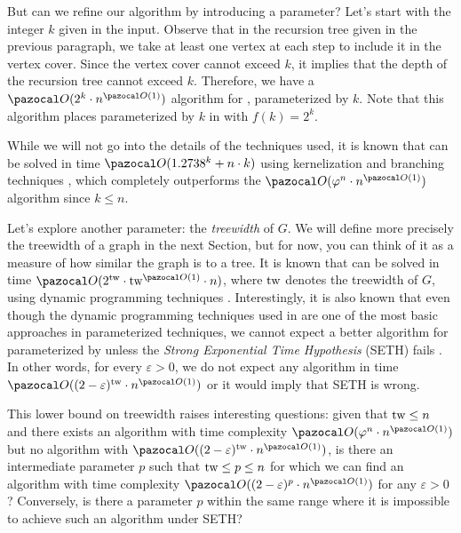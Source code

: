 \medskip

But can we refine our algorithm by introducing a parameter? Let's start with the integer $k$ given in the input. Observe that in the recursion tree given in the previous paragraph, we take at least one vertex at each step to include it in the vertex cover. Since the vertex cover cannot exceed $k$, it implies that the depth of the recursion tree cannot exceed $k$. Therefore, we have a $\O(2^k \cdot n^{\O(1)})$ algorithm for , parameterized by $k$. Note that this algorithm places  parameterized by $k$ in  with $f(k) = 2^k$.

While we will not go into the details of the techniques used, it is known that  can be solved in time $\O(1.2738^k + n\cdot k)$ using kernelization and branching techniques \cite{chen2006improved}, which completely outperforms the $\O(\varphi^n \cdot n^{\O(1)})$ algorithm since $k \leq n$.

\medskip

Let's explore another parameter: the \textit{treewidth} of $G$. We will define more precisely the treewidth of a graph in the next Section, but for now, you can think of it as a measure of how similar the graph is to a tree. It is known that  can be solved in time $\O(2^{\tw}\cdot\tw^{\O(1)}\cdot n)$, where $\text{tw}$ denotes the treewidth of $G$, using dynamic programming techniques \cite[Corollary~7.6]{cygan2015parameterized}. Interestingly, it is also known that even though the dynamic programming techniques used in \cite[Corollary~7.6]{cygan2015parameterized} are one of the most basic approaches in parameterized techniques, we cannot expect a better algorithm for  parameterized by \tw{} unless the \textit{Strong Exponential Time Hypothesis} (SETH) fails \cite{lokshtanov2011known}. In other words, for every $\varepsilon > 0$, we do not expect any algorithm in time $\O((2-\varepsilon)^\tw \cdot n^{\O(1)})$ or it would imply that SETH is wrong.

This lower bound on treewidth raises interesting questions: given that $\text{tw}{} \leq n$ and there exists an algorithm with time complexity $\O(\varphi^n \cdot n^{\O(1)})$ but no algorithm with $\O((2 - \varepsilon)^\tw  \cdot n^{\O(1)})$, is there an intermediate parameter $p$ such that $\text{tw} \leq p \leq n$ for which we can find an algorithm with time complexity $\O((2 - \varepsilon)^p \cdot n^{\O(1)})$ for any $\varepsilon > 0$?  Conversely, is there a parameter $p$ within the same range where it is impossible to achieve such an algorithm under SETH?

